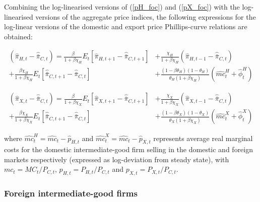 \documentclass[a4paper,11pt]{article}
\numberwithin{equation}{section}
\begin{document}
	Combining the log-linearised versions of (\ref{pH_foc}) and (\ref{pX_foc}) with the log-linearised versions of the aggregate price indices, the following expressions for the log-linear versions of the domestic and export price Phillips-curve relations are obtained:
	
	\begin{equation} \label{phillips_dom}
	\begin{split}
	\left(\hat{\pi}_{H,t}-\hat{\bar{\pi}}_{C,t}\right)=\frac{\beta}{1+\beta\chi_H}E_t\left[\hat{\pi}_{H,t+1}-\hat{\bar{\pi}}_{C,t+1}\right]& +\frac{\chi_H}{1+\beta\chi_H}\left(\hat{\pi}_{H,t-1}-\hat{\bar{\pi}}_{C,t}\right) \\ +\frac{\beta\chi_H}{1+\beta\chi_H}E_t\left[\hat{\bar{\pi}}_{C,t+1}-\hat{\bar{\pi}}_{C,t}\right]&+\frac{\left(1-\beta\theta_H\right)\left(1-\theta_H\right)}{\theta_H\left(1+\beta\chi_H\right)}\left(\widehat{mc}^H_t+\hat{\phi}^H_t\right)
	\end{split}
	\end{equation}
	
	\begin{equation} \label{phillips_export}	
	\begin{split}
	\left(\hat{\pi}_{X,t}-\hat{\bar{\pi}}_{C,t}\right)=\frac{\beta}{1+\beta\chi_X}E_t\left[\hat{\pi}_{X,t+1}-\hat{\bar{\pi}}_{C,t+1}\right]& +\frac{\chi_X}{1+\beta\chi_X}\left(\hat{\pi}_{X,t-1}-\hat{\bar{\pi}}_{C,t}\right)  \\ +\frac{\beta\chi_X}{1+\beta\chi_X}E_t\left[\hat{\bar{\pi}}_{C,t+1}-\hat{\bar{\pi}}_{C,t}\right]&+\frac{\left(1-\beta\theta_X\right)\left(1-\theta_X\right)}{\theta_X\left(1+\beta\chi_X\right)}\left(\widehat{mc}^X_t+\hat{\phi}^X_t\right)
	\end{split}
	\end{equation}
	
	where $\widehat{mc}^H_t=\widehat{mc}_t-\hat{p}_{H,t}$ and $\widehat{mc}^X_t=\widehat{mc}_t-\hat{p}_{X,t}$ represents average real marginal costs for the domestic intermediate-good firm selling in the domestic and foreign markets respectively (expressed as log-deviation from steady state), with $mc_t=MC_t/P_{C,t}$, $p_{H,t}=P_{H,t}/P_{C,t}$ and $p_{X,t}=P_{X,t}/P_{C,t}$. 

	
	\subsubsection{Foreign intermediate-good firms}
	
\end{document}

